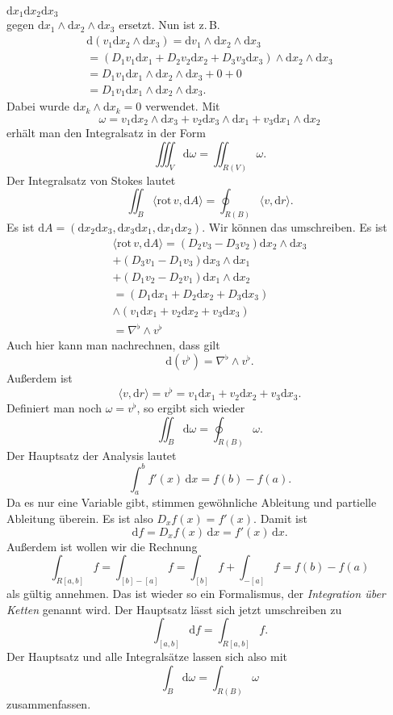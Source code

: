 \documentclass[a4paper,10pt,fleqn,twocolumn,twoside]{article}
\begin{document}
$\mathrm dx_1\mathrm dx_2\mathrm dx_3$\\
gegen $\mathrm dx_1\wedge\mathrm dx_2\wedge\mathrm dx_3$
ersetzt. Nun ist z.\,B.
\begin{gather*}\mathrm d(v_1\mathrm dx_2\wedge\mathrm dx_3)
= \mathrm dv_1\wedge\mathrm dx_2\wedge\mathrm dx_3\\
= (D_1v_1\mathrm dx_1+D_2v_2\mathrm dx_2+D_3v_3\mathrm dx_3)
\wedge\mathrm dx_2\wedge\mathrm dx_3\\
= D_1v_1\mathrm dx_1\wedge\mathrm dx_2\wedge\mathrm dx_3+0+0\\
= D_1v_1\mathrm dx_1\wedge\mathrm dx_2\wedge\mathrm dx_3.
\end{gather*}
Dabei wurde $\mathrm dx_k\wedge\mathrm dx_k=0$ verwendet.
Mit
\[\omega = v_1\mathrm dx_2\wedge\mathrm dx_3
+v_2\mathrm dx_3\wedge\mathrm dx_1
+v_3\mathrm dx_1\wedge\mathrm dx_2\]
erhält man den Integralsatz in der Form
\[\iiint_V \mathrm d\omega = \iint_{R(V)} \omega.\]
Der Integralsatz von Stokes lautet
\[\iint_B \langle\mathrm{rot}\,v,\mathrm dA\rangle
= \oint_{R(B)} \langle v,\mathrm dr\rangle.\]
Es ist
$\mathrm dA = (\mathrm dx_2\mathrm dx_3,\mathrm dx_3\mathrm dx_1,
\mathrm dx_1\mathrm dx_2)$.
Wir können das umschreiben. Es ist
\begin{gather*}
\langle\mathrm{rot}\,v,\mathrm dA\rangle
= (D_2v_3-D_3v_2)\mathrm dx_2\wedge\mathrm dx_3\\
+ (D_3v_1-D_1v_3)\mathrm dx_3\wedge\mathrm dx_1\\
+ (D_1v_2-D_2v_1)\mathrm dx_1\wedge\mathrm dx_2\\
= (D_1\mathrm dx_1+D_2\mathrm dx_2+D_3\mathrm dx_3)\\
\wedge (v_1\mathrm dx_1+v_2\mathrm dx_2+v_3\mathrm dx_3)\\
= \nabla^\flat\wedge v^\flat
\end{gather*}
Auch hier kann man nachrechnen, dass gilt
\[\mathrm d(v^\flat) = \nabla^\flat\wedge v^\flat.\]
Außerdem ist
\[\langle v,\mathrm dr\rangle = v^\flat
= v_1\mathrm dx_1+v_2\mathrm dx_2+v_3\mathrm dx_3.\]
Definiert man noch $\omega = v^\flat$, so ergibt sich wieder
\[\iint_B \mathrm d\omega = \oint_{R(B)}\omega.\]
%
Der Hauptsatz der Analysis lautet
\[\int_a^b f'(x)\,\mathrm dx = f(b)-f(a).\]
Da es nur eine Variable gibt, stimmen gewöhnliche Ableitung und
partielle Ableitung überein. Es ist also $D_x f(x) = f'(x)$.
%
Damit ist
\[\mathrm df = D_x f(x)\,\mathrm dx = f'(x)\,\mathrm dx.\]
%
Außerdem ist wollen wir die Rechnung
\[\int_{R[a,b]} f = \int_{[b]-[a]}f = \int_{[b]} f + \int_{-[a]} f
= f(b)-f(a)\]
als gültig annehmen. Das ist wieder so ein Formalismus, der
\textit{Integration über Ketten} genannt wird.
%
Der Hauptsatz lässt sich jetzt umschreiben zu
\[\int_{[a,b]} \mathrm df = \int_{R[a,b]}f.\]
Der Hauptsatz und alle Integralsätze lassen sich also mit
\[\int_B \mathrm d\omega = \int_{R(B)}\omega\]
zusammenfassen.
\end{document}
